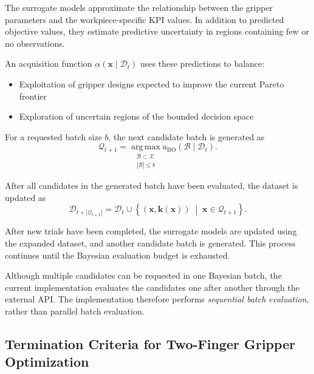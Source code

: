 The surrogate models approximate the relationship between the gripper parameters and the
workpiece-specific KPI values. In addition to predicted objective values, they estimate predictive
uncertainty in regions containing few or no observations.

An acquisition function $\alpha(\mathbf{x}\mid\mathcal{D}_t)$ uses these predictions to balance:
\begin{itemize}
    \item Exploitation of gripper designs expected to improve the current Pareto frontier
    \item Exploration of uncertain regions of the bounded decision space
\end{itemize}

For a requested batch size $b$, the next candidate batch is generated as
\begin{equation}
    \mathcal{Q}_{t+1}
    =
    \operatorname*{arg\,max}_{
        \substack{
            \mathcal{B}\subset\mathcal{X}\\
            |\mathcal{B}|\leq b
        }
    }
    a_{\mathrm{BO}}(\mathcal{B}\mid\mathcal{D}_t).
\end{equation}

After all candidates in the generated batch have been evaluated, the dataset is updated as
\begin{equation}
    \mathcal{D}_{t+|\mathcal{Q}_{t+1}|}
    =
    \mathcal{D}_t
    \cup
    \left\{
        \left(
            \mathbf{x},
            \mathbf{k}(\mathbf{x})
        \right)
        \;\middle|\;
        \mathbf{x}\in\mathcal{Q}_{t+1}
    \right\}.
\end{equation}

After new trials have been completed, the surrogate models are updated using the expanded dataset,
and another candidate batch is generated. This process continues until the Bayesian evaluation
budget is exhausted.

Although multiple candidates can be requested in one Bayesian batch, the current implementation
evaluates the candidates one after another through the external API. The implementation therefore
performs \emph{sequential batch evaluation}, rather than parallel batch evaluation.
\subsection{Termination Criteria for Two-Finger Gripper Optimization}
\label{sec:two_finger_termination}

